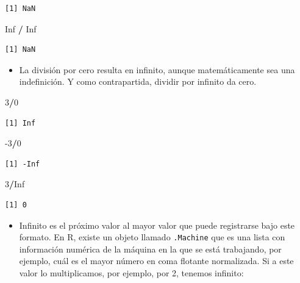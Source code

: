 \documentclass[openany]{book}
\newenvironment{Shaded}{\begin{snugshade}}{\end{snugshade}}
\newcommand{\DecValTok}[1]{\textcolor[rgb]{0.00,0.00,0.81}{#1}}
\newcommand{\OperatorTok}[1]{\textcolor[rgb]{0.81,0.36,0.00}{\textbf{#1}}}
\newcommand{\OtherTok}[1]{\textcolor[rgb]{0.56,0.35,0.01}{#1}}
\newcommand{\StringTok}[1]{\textcolor[rgb]{0.31,0.60,0.02}{#1}}
\providecommand{\tightlist}{%
  \setlength{\itemsep}{0pt}\setlength{\parskip}{0pt}}
\begin{document}
\begin{verbatim}
[1] NaN
\end{verbatim}

\begin{Shaded}
\begin{Highlighting}[]
\OtherTok{Inf} \OperatorTok{/}\StringTok{ }\OtherTok{Inf}
\end{Highlighting}
\end{Shaded}

\begin{verbatim}
[1] NaN
\end{verbatim}

\begin{itemize}
\tightlist
\item
  La división por cero resulta en infinito, aunque matemáticamente sea una indefinición. Y como contrapartida, dividir por infinito da cero.
\end{itemize}

\begin{Shaded}
\begin{Highlighting}[]
\DecValTok{3}\OperatorTok{/}\DecValTok{0}
\end{Highlighting}
\end{Shaded}

\begin{verbatim}
[1] Inf
\end{verbatim}

\begin{Shaded}
\begin{Highlighting}[]
\DecValTok{-3}\OperatorTok{/}\DecValTok{0}
\end{Highlighting}
\end{Shaded}

\begin{verbatim}
[1] -Inf
\end{verbatim}

\begin{Shaded}
\begin{Highlighting}[]
\DecValTok{3}\OperatorTok{/}\OtherTok{Inf}
\end{Highlighting}
\end{Shaded}

\begin{verbatim}
[1] 0
\end{verbatim}

\begin{itemize}
\tightlist
\item
  Infinito es el próximo valor al mayor valor que puede registrarse bajo este formato. En R, existe un objeto llamado \texttt{.Machine} que es una lista con información numérica de la máquina en la que se está trabajando, por ejemplo, cuál es el mayor número en coma flotante normalizada. Si a este valor lo multiplicamos, por ejemplo, por 2, tenemos infinito:
\end{itemize}
\end{document}
